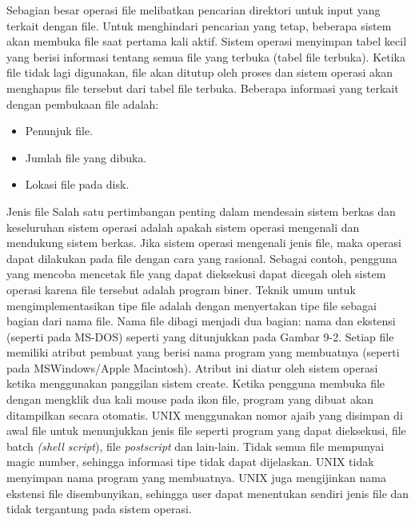 \documentclass[12pt]{article}
\begin{document}
\begin{itemize}
              Sebagian besar operasi file melibatkan pencarian direktori untuk input yang terkait dengan file. Untuk menghindari pencarian yang tetap, beberapa sistem akan membuka file saat pertama kali aktif. Sistem operasi menyimpan tabel kecil yang berisi informasi tentang semua file yang terbuka (tabel file terbuka). Ketika file tidak lagi digunakan, file akan ditutup oleh proses dan sistem operasi akan menghapus file tersebut dari tabel file terbuka. Beberapa informasi yang terkait dengan pembukaan file adalah:

            \begin{itemize}
                \item Penunjuk file. 
     		\item Jumlah file yang dibuka. 
     		\item Lokasi file pada disk. 
              \end{itemize}
    
      Jenis file 
      Salah satu pertimbangan penting dalam mendesain sistem berkas dan keseluruhan sistem operasi adalah apakah sistem operasi mengenali dan mendukung sistem berkas. Jika sistem operasi mengenali jenis file, maka operasi dapat dilakukan pada file dengan cara yang rasional. Sebagai contoh, pengguna yang mencoba mencetak file yang dapat dieksekusi dapat dicegah oleh sistem operasi karena file tersebut adalah program biner. Teknik umum untuk mengimplementasikan tipe file adalah dengan menyertakan tipe file sebagai bagian dari nama file. Nama file dibagi menjadi dua bagian: nama dan ekstensi (seperti pada MS-DOS) seperti yang ditunjukkan pada Gambar 9-2. Setiap file memiliki atribut pembuat yang berisi nama program yang membuatnya (seperti pada MSWindows/Apple Macintosh). Atribut ini diatur oleh sistem operasi ketika menggunakan panggilan sistem create. Ketika pengguna membuka file dengan mengklik dua kali mouse pada ikon file, program yang dibuat akan ditampilkan secara otomatis. UNIX menggunakan nomor ajaib yang disimpan di awal file untuk menunjukkan jenis file seperti program yang dapat dieksekusi, file batch \textit{(shell script}), file \textit{postscript} dan lain-lain. Tidak semua file mempunyai magic number, sehingga informasi tipe tidak dapat dijelaskan. UNIX tidak menyimpan nama program yang membuatnya. UNIX juga mengijinkan nama ekstensi file disembunyikan, sehingga user dapat menentukan sendiri jenis file dan tidak tergantung pada sistem operasi. 


\end{itemize}
\end{document}
